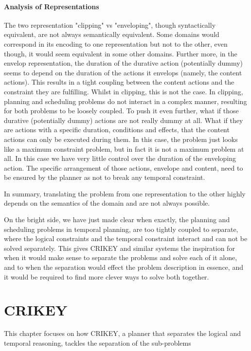 \documentclass
[a4paper
,english
,parskip=half
,bibliography=totoc
]{scrreprt}
\begin{document}
        \subsubsection{Analysis of Representations}
        The two representation "clipping" vs "enveloping", though syntactically equivalent, are not always semantically equivalent.
        Some domains would correspond in its encoding to one representation but not to the other, even though, it would seem equivalent in some other domains. Further more, in the envelop representation, the duration of the durative action (potentially dummy) seems to depend on the duration of the actions it envelops (namely, the content actions). This results in a tight coupling between the content actions and the constraint they are fulfilling. Whilst in clipping, this is not the case. In clipping, planning and scheduling problems do not interact in a complex manner, resulting for both problems to be loosely coupled.
        To push it even further, what if those durative (potentially dummy) actions are not really dummy at all. What if they are actions with a specific duration, conditions and effects, that the content actions can only be executed during them. In this case, the problem just looks like a maximum constraint problem, but in fact it is not a maximum problem at all. In this case we have very little control over the duration of the enveloping action. The specific arrangement of those actions, envelope and content, need to be ensured by the planner as not to break any temporal constraint.

         In summary, translating the problem from one representation to the other highly depends on the semantics of the domain and are not always possible.
        
        On the bright side, we have just made clear when exactly, the planning and scheduling problems in temporal planning, are too tightly coupled to separate, where the logical constraints and the temporal constraint interact and can not be solved separately. This gives CRIKEY and similar systems the inspiration for when it would make sense to separate the problems and solve each of it alone, and to when the separation would effect the problem description in essence, and it would be required to find more clever ways to solve both together.



\chapter{CRIKEY} \label{crikey}
   This chapter focuses on how CRIKEY, a planner that separates the logical and temporal reasoning, tackles the separation of the sub-problems 
\end{document}
